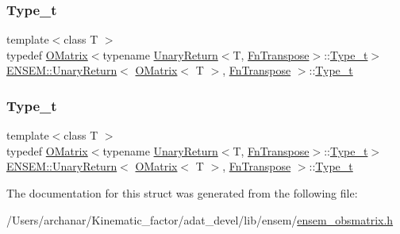 \subsubsection{\texorpdfstring{Type\_t}{Type\_t}\hspace{0.1cm}{\footnotesize\ttfamily [1/2]}}
{\footnotesize\ttfamily template$<$class T $>$ \\
typedef \mbox{\hyperlink{classENSEM_1_1OMatrix}{O\+Matrix}}$<$typename \mbox{\hyperlink{structENSEM_1_1UnaryReturn}{Unary\+Return}}$<$T, \mbox{\hyperlink{structENSEM_1_1FnTranspose}{Fn\+Transpose}}$>$\+::\mbox{\hyperlink{structENSEM_1_1UnaryReturn_3_01OMatrix_3_01T_01_4_00_01FnTranspose_01_4_a5baf7be8d88ac60f5375088eb7463444}{Type\+\_\+t}}$>$ \mbox{\hyperlink{structENSEM_1_1UnaryReturn}{E\+N\+S\+E\+M\+::\+Unary\+Return}}$<$ \mbox{\hyperlink{classENSEM_1_1OMatrix}{O\+Matrix}}$<$ T $>$, \mbox{\hyperlink{structENSEM_1_1FnTranspose}{Fn\+Transpose}} $>$\+::\mbox{\hyperlink{structENSEM_1_1UnaryReturn_3_01OMatrix_3_01T_01_4_00_01FnTranspose_01_4_a5baf7be8d88ac60f5375088eb7463444}{Type\+\_\+t}}}

\mbox{\label{structENSEM_1_1UnaryReturn_3_01OMatrix_3_01T_01_4_00_01FnTranspose_01_4_a5baf7be8d88ac60f5375088eb7463444}} 
\subsubsection{\texorpdfstring{Type\_t}{Type\_t}\hspace{0.1cm}{\footnotesize\ttfamily [2/2]}}
{\footnotesize\ttfamily template$<$class T $>$ \\
typedef \mbox{\hyperlink{classENSEM_1_1OMatrix}{O\+Matrix}}$<$typename \mbox{\hyperlink{structENSEM_1_1UnaryReturn}{Unary\+Return}}$<$T, \mbox{\hyperlink{structENSEM_1_1FnTranspose}{Fn\+Transpose}}$>$\+::\mbox{\hyperlink{structENSEM_1_1UnaryReturn_3_01OMatrix_3_01T_01_4_00_01FnTranspose_01_4_a5baf7be8d88ac60f5375088eb7463444}{Type\+\_\+t}}$>$ \mbox{\hyperlink{structENSEM_1_1UnaryReturn}{E\+N\+S\+E\+M\+::\+Unary\+Return}}$<$ \mbox{\hyperlink{classENSEM_1_1OMatrix}{O\+Matrix}}$<$ T $>$, \mbox{\hyperlink{structENSEM_1_1FnTranspose}{Fn\+Transpose}} $>$\+::\mbox{\hyperlink{structENSEM_1_1UnaryReturn_3_01OMatrix_3_01T_01_4_00_01FnTranspose_01_4_a5baf7be8d88ac60f5375088eb7463444}{Type\+\_\+t}}}



The documentation for this struct was generated from the following file\+:\begin{DoxyCompactItemize}
\item 
/\+Users/archanar/\+Kinematic\+\_\+factor/adat\+\_\+devel/lib/ensem/\mbox{\hyperlink{lib_2ensem_2ensem__obsmatrix_8h}{ensem\+\_\+obsmatrix.\+h}}\end{DoxyCompactItemize}
